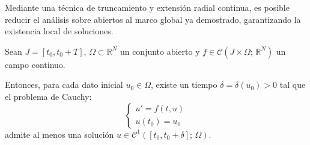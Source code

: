 Mediante una técnica de truncamiento y extensión radial continua, es posible reducir el análisis sobre abiertos al marco global ya demostrado, garantizando la existencia local de soluciones.

\begin{teorema}
    Sean $J = [t_0, t_0 + T]$, $\Omega \subset \mathbb{R}^N$ un conjunto abierto y $f \in \mathcal{C}(J \times \Omega; \, \mathbb{R}^N)$ un campo continuo.
    
    Entonces, para cada dato inicial $u_0 \in \Omega$, existe un tiempo $\delta = \delta(u_0) > 0$ tal que el problema de Cauchy:
    \[
        \begin{cases}
            u' = f(t, u) \\
            u(t_0) = u_0
        \end{cases}
    \]
    admite al menos una solución $u \in \mathcal{C}^1([t_0, t_0 + \delta]; \, \Omega)$.
\end{teorema}


